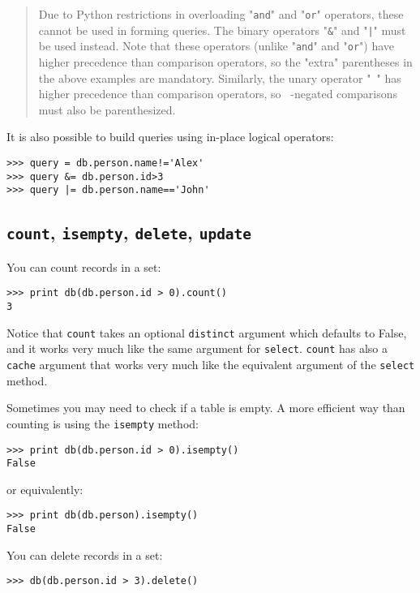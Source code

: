 \documentclass[justified,sixbynine,notoc]{tufte-book}
\def\ft{\small\tt}
\def\inxx#1{\index{#1}}
\begin{document}
\begin{fullwidth}
\begin{quote}Due to Python restrictions in overloading "{\ft and}" and "{\ft or}" operators, these cannot be used in forming queries.  The binary operators "{\ft \&}" and "{\ft |}" must be used instead. Note that these operators (unlike "{\ft and}" and "{\ft or}") have higher precedence than comparison operators, so the "extra" parentheses in the above examples are mandatory. Similarly, the unary operator "{\ft ~}" has higher precedence than comparison operators, so {\ft ~}-negated comparisons must also be parenthesized.\end{quote}
It is also possible to build queries using in-place logical operators:

\begin{lstlisting}
>>> query = db.person.name!='Alex'
>>> query &= db.person.id>3
>>> query |= db.person.name=='John'
\end{lstlisting}

\goodbreak\subsection{{\ft count}, {\ft isempty}, {\ft delete}, {\ft update}}

You can count records in a set:

\inxx{count} \inxx{isempty}

\begin{lstlisting}
>>> print db(db.person.id > 0).count()
3
\end{lstlisting}

Notice that {\ft count} takes an optional {\ft distinct} argument which defaults to False, and it works very much like the same argument for {\ft select}. {\ft count} has also a {\ft cache} argument that works very much like the equivalent argument of the {\ft select} method.

Sometimes you may need to check if a table is empty. A more efficient way than counting is using the {\ft isempty} method:

\begin{lstlisting}
>>> print db(db.person.id > 0).isempty()
False
\end{lstlisting}
\noindent or equivalently:

\begin{lstlisting}
>>> print db(db.person).isempty()
False
\end{lstlisting}

You can delete records in a set:

\inxx{delete}
\begin{lstlisting}
>>> db(db.person.id > 3).delete()
\end{lstlisting}


\end{fullwidth}
\end{document}
